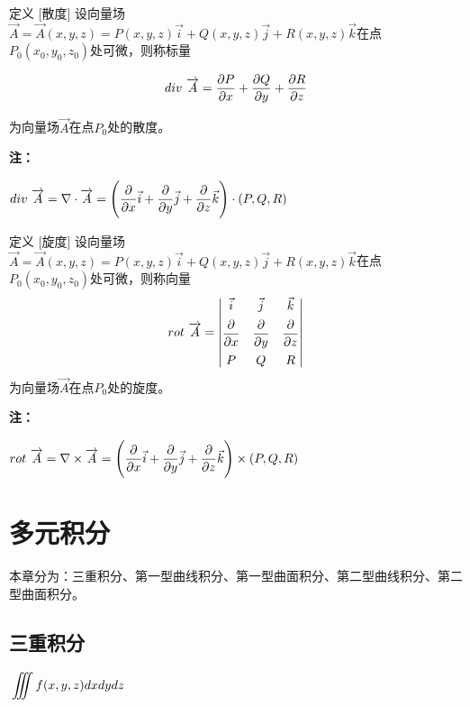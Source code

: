 \documentclass[a4paper,12pt,oneside,fontset=none]{ctexbook}
\let\olddfrac\dfrac
\renewcommand{\dfrac}[2]{
    \olddfrac{#1\vrule width 0pt height 1.15em depth 0em}{#2\vrule width 0pt height 0em depth 0.6em}
}
\let\oldiiint\iiint
\renewcommand{\iiint}{\displaystyle{\vrule width 0pt height 0em depth 0em}\oldiiint}
\newcounter{definition}[chapter]
\newenvironment{definition}[1][]{\begin{defBox}{定义}{#1}}{\end{defBox}}
\newenvironment{note}{
    \par\vspace{0.5em}\noindent
    \textbf{\color{NoteColor} 注：}
}{
    \par\vspace{0.5em}
}
\numberwithin{equation}{chapter}
\begin{document}
\begin{definition}
    [散度]
    设向量场$\overrightarrow{A} = \overrightarrow{A}(x,y,z) = P(x,y,z)\overrightarrow{i} + Q(x,y,z)\overrightarrow{j} + R(x,y,z)\overrightarrow{k}$在点$P_0(x_0,y_0,z_0)$处可微，则称标量
    $$div \ \overrightarrow{A} = \dfrac{\partial P}{\partial x} + \dfrac{\partial Q}{\partial y} + \dfrac{\partial R}{\partial z}$$
    为向量场$\overrightarrow{A}$在点$P_0$处的散度。
\end{definition}
\begin{note}
    $div \ \overrightarrow{A} = \nabla \cdot \overrightarrow{A} = \left(\dfrac{\partial}{\partial x}\vec{i} + \dfrac{\partial}{\partial y}\vec{j} + \dfrac{\partial}{\partial z}\vec{k}\right) \cdot (P, Q, R)$
\end{note}
\begin{definition}
    [旋度]
    设向量场$\overrightarrow{A} = \overrightarrow{A}(x,y,z) = P(x,y,z)\overrightarrow{i} + Q(x,y,z)\overrightarrow{j} + R(x,y,z)\overrightarrow{k}$在点$P_0(x_0,y_0,z_0)$处可微，则称向量
    $$rot \ \overrightarrow{A} = \begin{vmatrix}
        \vec{i} & \vec{j} & \vec{k} \\
        \dfrac{\partial}{\partial x} & \dfrac{\partial}{\partial y} & \dfrac{\partial}{\partial z} \\
        P & Q & R
    \end{vmatrix}$$
    为向量场$\overrightarrow{A}$在点$P_0$处的旋度。
\end{definition}
\begin{note}
    $rot \ \overrightarrow{A} = \nabla \times \overrightarrow{A} = \left(\dfrac{\partial}{\partial x}\vec{i} + \dfrac{\partial}{\partial y}\vec{j} + \dfrac{\partial}{\partial z}\vec{k}\right) \times (P, Q, R)$
\end{note}



\chapter{多元积分}

本章分为：三重积分、第一型曲线积分、第一型曲面积分、第二型曲线积分、第二型曲面积分。

\section{三重积分}
$ \iiint f(x,y,z)dx dy dz$ 
\end{document}
